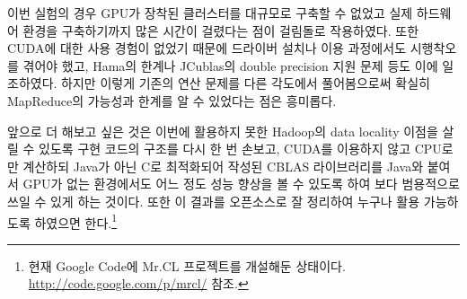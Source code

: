 \documentclass[a4paper]{article}
\begin{document}
\begin{multicols}{2}
이번 실험의 경우 GPU가 장착된 클러스터를 대규모로 구축할 수 없었고 실제 하드웨어 환경을 구축하기까지 많은 시간이 걸렸다는 점이 걸림돌로 작용하였다.
또한 CUDA에 대한 사용 경험이 없었기 때문에 드라이버 설치나 이용 과정에서도 시행착오를 겪어야 했고, Hama의 한계나 JCublas의 double precision 지원 문제 등도 이에 일조하였다.
하지만 이렇게 기존의 연산 문제를 다른 각도에서 풀어봄으로써 확실히 MapReduce의 가능성과 한계를 알 수 있었다는 점은 흥미롭다.

앞으로 더 해보고 싶은 것은 이번에 활용하지 못한 Hadoop의 data locality 이점을 살릴 수 있도록 구현 코드의 구조를 다시 한 번 손보고, CUDA를 이용하지 않고 CPU로만 계산하되 Java가 아닌 C로 최적화되어 작성된 CBLAS 라이브러리를 Java와 붙여서 GPU가 없는 환경에서도 어느 정도 성능 향상을 볼 수 있도록 하여 보다 범용적으로 쓰일 수 있게 하는 것이다.
또한 이 결과를 오픈소스로 잘 정리하여 누구나 활용 가능하도록 하였으면 한다.\footnote{현재 Google Code에 Mr.CL 프로젝트를 개설해둔 상태이다. \url{http://code.google.com/p/mrcl/} 참조.}

\end{multicols}
\end{document}
